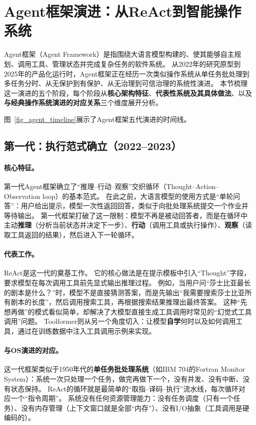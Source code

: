 \section{Agent框架演进：从ReAct到智能操作系统}
\label{sec:agentevolution}

Agent框架（Agent Framework）是指围绕大语言模型构建的、使其能够自主规划、调用工具、管理状态并完成复杂任务的软件系统。
从2022年的研究原型到2025年的产品化运行时，Agent框架正在经历一次类似操作系统从单任务批处理到多任务分时、从无保护到有保护、从无治理到可信治理的系统性演进。
本节梳理这一演进的五个阶段，每个阶段从\textbf{核心架构特征}、\textbf{代表性系统及其具体做法}、以及\textbf{与经典操作系统演进的对应关系}三个维度展开分析。

图~\ref{fig_agent_timeline}展示了Agent框架五代演进的时间线。


\subsection{第一代：执行范式确立（2022--2023）}

\paragraph{核心特征。}
第一代Agent框架确立了``推理--行动--观察''交织循环（Thought--Action--Observation loop）的基本范式。
在此之前，大语言模型的使用方式是``单轮问答''：用户给出提示，模型一次性返回回答，类似于向批处理系统提交一个作业并等待输出。
第一代框架打破了这一限制：模型不再是被动回答者，而是在循环中主动\textbf{推理}（分析当前状态并决定下一步）、\textbf{行动}（调用工具或执行操作）、\textbf{观察}（读取工具返回的结果），然后进入下一轮循环。

\paragraph{代表工作。}
ReAct\cite{yao2023react}是这一代的奠基工作。
它的核心做法是在提示模板中引入``Thought''字段，要求模型在每次调用工具前先显式输出推理过程。
例如，当用户问``莎士比亚最长的剧本是什么？''时，模型不是直接猜测答案，而是先输出``我需要搜索莎士比亚所有剧本的长度''，然后调用搜索工具，再根据搜索结果推理出最终答案。
这种``先想再做''的模式看似简单，却解决了大模型直接生成工具调用时常见的``幻觉式工具调用''问题。
Toolformer\cite{schick2023toolformer}则从另一个角度切入：让模型\textbf{自学}何时以及如何调用工具，通过在训练数据中注入工具调用示例来实现。

\paragraph{与OS演进的对应。}
这一代框架类似于1950年代的\textbf{单任务批处理系统}（如IBM 704的Fortran Monitor System）：系统一次只处理一个任务，做完再做下一个，没有并发、没有中断、没有状态保持。
ReAct的循环就是最简单的``取指--译码--执行''流水线，每次循环对应一个``指令周期''。
系统没有任何资源管理能力：没有任务调度（只有一个任务）、没有内存管理（上下文窗口就是全部``内存''）、没有I/O抽象（工具调用是硬编码的）。

